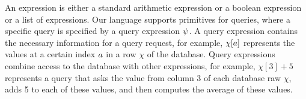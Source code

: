 An expression is
either a standard arithmetic expression or a boolean expression or a list of expressions.
Our language supports primitives for queries, where a specific query is specified by a query expression $\psi$. A query expression contains the necessary information for a query request, for example, $\chi[a]$ represents the values at a certain index $a$ in a row $\chi$ of the database. Query expressions combine access to the database with other expressions, for example, $\chi[3] + 5$ represents a query that asks the value from column 3 of each database raw $\chi$, adds 5 to each of these values, and then computes the average of these values.


